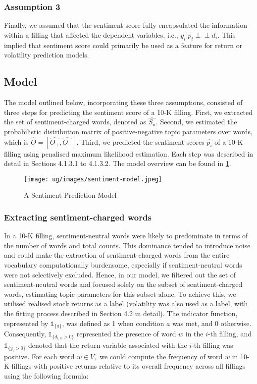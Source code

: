 \documentclass[logo,bsc,singlespacing,parskip]{infthesis}
\begin{document}
\subsubsection{Assumption 3}
Finally, we assumed that the sentiment score fully encapsulated the information within a filling that affected the dependent variables, i.e., $y_i|p_i \perp \!\!\! \perp   d_i$. This implied that sentiment score could primarily be used as a feature for return or volatility prediction models. 

\subsection{Model}
The model outlined below, incorporating these three assumptions, consisted of three steps for predicting the sentiment score of a 10-K filling. First, we extracted the set of sentiment-charged words, denoted as $\hat{S_n}$. Second, we estimated the probabilistic distribution matrix of positive-negative topic parameters over words, which is $\hat{O}=[\hat{O_+},\hat{O_-}]$. Third, we predicted the sentiment scores $\hat{p_i}$ of a 10-K filling using penalised maximum likelihood estimation. Each step was described in detail in Sections 4.1.3.1 to 4.1.3.2. The model overview can be found in \ref{fig:sentiment-model}.

\begin{figure}[h!]
    \centering
    \texttt{[image: ug/images/sentiment-model.jpeg]}
    \caption{A Sentiment Prediction Model}
    \label{fig:sentiment-model}
\end{figure}

\subsubsection{Extracting sentiment-charged words}
In a 10-K filling, sentiment-neutral words were likely to predominate in terms of the number of words and total counts. This dominance tended to introduce noise and could make the extraction of sentiment-charged words from the entire vocabulary computationally burdensome, especially if sentiment-neutral words were not selectively excluded. Hence, in our model, we filtered out the set of sentiment-neutral words and focused solely on the subset of sentiment-charged words, estimating topic parameters for this subset alone. To achieve this, we utilised realised stock returns as a label (volatility was also used as a label, with the fitting process described in Section 4.2 in detail). The indicator function, represented by $\mathbb{1}_{\{a\}}$, was defined as 1 when condition $a$ was met, and 0 otherwise. Consequently, $\mathbb{1}_{\{d_{i,w} > 0\}}$ represented the presence of word $w$ in the $i$-th filling, and $\mathbb{1}_{\{y_i > 0\}}
$ denoted that the return variable associated with the $i$-th filling was positive. For each word $w \in V,$ we could compute the frequency of word $w$ in 10-K fillings with positive returns relative to its overall frequency across all fillings using the following formula: 
\end{document}

